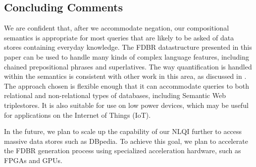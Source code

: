 \documentclass[../main.tex]{subfiles}
\begin{document}
\begin{refsection}
\section{Concluding Comments}

We are confident that, after we accommodate negation, our compositional semantics is appropriate for most queries that are likely to be asked of data stores containing everyday knowledge.
The FDBR datastructure presented in this paper can be used to handle many kinds of complex language features, including chained prepositional phrases and superlatives.  The way quantification is handled within the semantics is consistent with other work in this area, as discussed in .
The approach chosen is flexible enough that it can accommodate queries to both relational and non-relational types of databases, including Semantic Web triplestores.  It is also suitable for use on low power devices, which may be useful for applications on the Internet of Things (IoT).

In the future, we plan to scale up the capability of our NLQI further to access massive data stores such as DBpedia.  To achieve this goal, we plan to accelerate the FDBR generation process using specialized acceleration hardware, such as FPGAs and GPUs.

\printbibliography[heading=subbibintoc]
\end{refsection}
\end{document}
